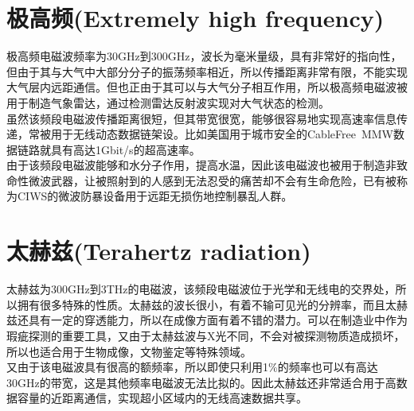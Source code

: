 \documentclass[UTF8]{article}
\begin{document}
\begin{CJK}{UTF8}{gkai}
\section{极高频(Extremely high frequency)}
极高频电磁波频率为30GHz到300GHz，波长为毫米量级，具有非常好的指向性，但由于其与大气中大部分分子的振荡频率相近，所以传播距离非常有限，不能实现大气层内远距通信。但也正由于其可以与大气分子相互作用，所以极高频电磁波被用于制造气象雷达，通过检测雷达反射波实现对大气状态的检测。\\
虽然该频段电磁波传播距离很短，但其带宽很宽，能够很容易地实现高速率信息传递，常被用于无线动态数据链架设。比如美国用于城市安全的CableFree\ MMW数据链路就具有高达1Gbit/s的超高速率。\\
由于该频段电磁波能够和水分子作用，提高水温，因此该电磁波也被用于制造非致命性微波武器，让被照射到的人感到无法忍受的痛苦却不会有生命危险，已有被称为CIWS的微波防暴设备用于远距无损伤地控制暴乱人群。
\section{太赫兹(Terahertz radiation)}
太赫兹为300GHz到3THz的电磁波，该频段电磁波位于光学和无线电的交界处，所以拥有很多特殊的性质。太赫兹的波长很小，有着不输可见光的分辨率，而且太赫兹还具有一定的穿透能力，所以在成像方面有着不错的潜力。可以在制造业中作为瑕疵探测的重要工具，又由于太赫兹波与X光不同，不会对被探测物质造成损坏，所以也适合用于生物成像，文物鉴定等特殊领域。\\
又由于该电磁波具有很高的额频率，所以即使只利用1\%的频率也可以有高达30GHz的带宽，这是其他频率电磁波无法比拟的。因此太赫兹还非常适合用于高数据容量的近距离通信，实现超小区域内的无线高速数据共享。

\end{CJK}


\end{document}
